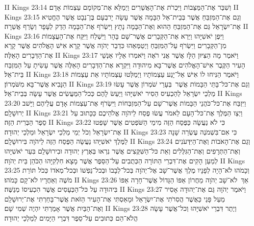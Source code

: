 II Kings 23:14	וְשִׁבַּר אֶת־הַמַּצֵּבוֹת וַיִּכְרֹת אֶת־הָאֲשֵׁרִים וַיְמַלֵּא אֶת־מְקוֹמָם עַצְמוֹת אָדָם׃
II Kings 23:15	וְגַם אֶת־הַמִּזְבֵּחַ אֲשֶׁר בְּבֵית־אֵל הַבָּמָה אֲשֶׁר עָשָׂה יָרבְעָם בֶּן־נְבָט אֲשֶׁר הֶחֱטִיא אֶת־יִשְׂרָאֵל גַּם אֶת־הַמִּזְבֵּחַ הַהוּא וְאֶת־הַבָּמָה נָתָץ וַיִּשְׂרֹף אֶת־הַבָּמָה הֵדַק לְעָפָר וְשָׂרַף אֲשֵׁרָה׃
II Kings 23:16	וַיִּפֶן יֹאשִׁיָּהוּ וַיַּרְא אֶת־הַקְּבָרִים אֲשֶׁר־שָׁם בָּהָר וַיִּשְׁלַח וַיִּקַּח אֶת־הָעֲצָמוֹת מִן־הַקְּבָרִים וַיִּשְׂרֹף עַל־הַמִּזְבֵּחַ וַיְטַמְּאֵהוּ כִּדְבַר יְהֹוָה אֲשֶׁר קָרָא אִישׁ הָאֱלֹהִים אֲשֶׁר קָרָא אֶת־הַדְּבָרִים הָאֵלֶּה׃
II Kings 23:17	וַיֹּאמֶר מָה הַצִּיּוּן הַלָּז אֲשֶׁר אֲנִי רֹאֶה וַיֹּאמְרוּ אֵלָיו אַנְשֵׁי הָעִיר הַקֶּבֶר אִישׁ־הָאֱלֹהִים אֲשֶׁר־בָּא מִיהוּדָה וַיִּקְרָא אֶת־הַדְּבָרִים הָאֵלֶּה אֲשֶׁר עָשִׂיתָ עַל הַמִּזְבַּח בֵּית־אֵל׃
II Kings 23:18	וַיֹּאמֶר הַנִּיחוּ לוֹ אִישׁ אַל־יָנַע עַצְמוֹתָיו וַיְמַלְּטוּ עַצְמוֹתָיו אֵת עַצְמוֹת הַנָּבִיא אֲשֶׁר־בָּא מִשֹּׁמְרוֹן׃
II Kings 23:19	וְגַם אֶת־כּל־בָּתֵּי הַבָּמוֹת אֲשֶׁר  בְּעָרֵי שֹׁמְרוֹן אֲשֶׁר עָשׂוּ מַלְכֵי יִשְׂרָאֵל לְהַכְעִיס הֵסִיר יֹאשִׁיָּהוּ וַיַּעַשׂ לָהֶם כְּכל־הַמַּעֲשִׂים אֲשֶׁר עָשָׂה בְּבֵית־אֵל׃
II Kings 23:20	וַיִּזְבַּח אֶת־כּל־כֹּהֲנֵי הַבָּמוֹת אֲשֶׁר־שָׁם עַל־הַמִּזְבְּחוֹת וַיִּשְׂרֹף אֶת־עַצְמוֹת אָדָם עֲלֵיהֶם וַיָּשׁב יְרוּשָׁלָ͏ִם׃
II Kings 23:21	וַיְצַו הַמֶּלֶךְ אֶת־כּל־הָעָם לֵאמֹר עֲשׂוּ פֶסַח לַיהֹוָה אֱלֹהֵיכֶם כַּכָּתוּב עַל סֵפֶר הַבְּרִית הַזֶּה׃
II Kings 23:22	כִּי לֹא נַעֲשָׂה כַּפֶּסַח הַזֶּה מִימֵי הַשֹּׁפְטִים אֲשֶׁר שָׁפְטוּ אֶת־יִשְׂרָאֵל וְכֹל יְמֵי מַלְכֵי יִשְׂרָאֵל וּמַלְכֵי יְהוּדָה׃
II Kings 23:23	כִּי אִם־בִּשְׁמֹנֶה עֶשְׂרֵה שָׁנָה לַמֶּלֶךְ יֹאשִׁיָּהוּ נַעֲשָׂה הַפֶּסַח הַזֶּה לַיהֹוָה בִּירוּשָׁלָ͏ִם׃
II Kings 23:24	וְגַם אֶת־הָאֹבוֹת וְאֶת־הַיִּדְּעֹנִים וְאֶת־הַתְּרָפִים וְאֶת־הַגִּלֻּלִים וְאֵת כּל־הַשִּׁקֻּצִים אֲשֶׁר נִרְאוּ בְּאֶרֶץ יְהוּדָה וּבִירוּשָׁלַ͏ִם בִּעֵר יֹאשִׁיָּהוּ לְמַעַן הָקִים אֶת־דִּבְרֵי הַתּוֹרָה הַכְּתֻבִים עַל־הַסֵּפֶר אֲשֶׁר מָצָא חִלְקִיָּהוּ הַכֹּהֵן בֵּית יְהֹוָה׃
II Kings 23:25	וְכָמֹהוּ לֹא־הָיָה לְפָנָיו מֶלֶךְ אֲשֶׁר־שָׁב אֶל־יְהֹוָה בְּכל־לְבָבוֹ וּבְכל־נַפְשׁוֹ וּבְכל־מְאֹדוֹ כְּכֹל תּוֹרַת מֹשֶׁה וְאַחֲרָיו לֹא־קָם כָּמֹהוּ׃
II Kings 23:26	אַךְ  לֹא־שָׁב יְהֹוָה מֵחֲרוֹן אַפּוֹ הַגָּדוֹל אֲשֶׁר־חָרָה אַפּוֹ בִּיהוּדָה עַל כּל־הַכְּעָסִים אֲשֶׁר הִכְעִיסוֹ מְנַשֶּׁה׃
II Kings 23:27	וַיֹּאמֶר יְהֹוָה גַּם אֶת־יְהוּדָה אָסִיר מֵעַל פָּנַי כַּאֲשֶׁר הֲסִרֹתִי אֶת־יִשְׂרָאֵל וּמָאַסְתִּי אֶת־הָעִיר הַזֹּאת אֲשֶׁר־בָּחַרְתִּי אֶת־יְרוּשָׁלַ͏ִם וְאֶת־הַבַּיִת אֲשֶׁר אָמַרְתִּי יִהְיֶה שְׁמִי שָׁם׃
II Kings 23:28	וְיֶתֶר דִּבְרֵי יֹאשִׁיָּהוּ וְכל־אֲשֶׁר עָשָׂה הֲלֹא־הֵם כְּתוּבִים עַל־סֵפֶר דִּבְרֵי הַיָּמִים לְמַלְכֵי יְהוּדָה׃

